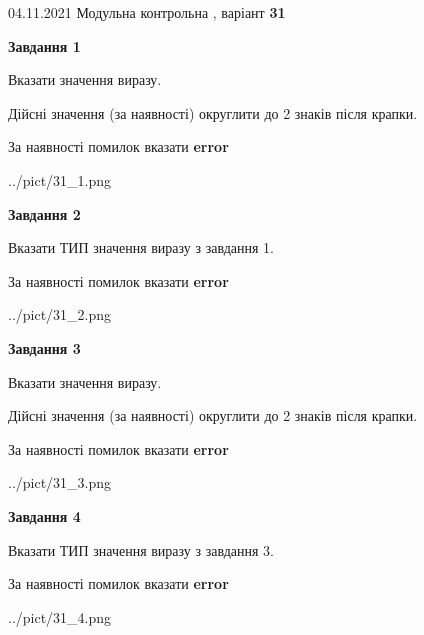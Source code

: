 \documentclass[11pt, ukrainian]{article}
\begin{document}
{04.11.2021 Модульна контрольна , варіант  \No \textbf { 31 }\par}
{
\begin {large}
{\begin {center}\textbf{Завдання 1}\end {center}}\par
Вказати значення виразу. \par
Дійсні значення (за наявності) округлити до 2 знаків після крапки. \par
За наявності помилок вказати \textbf{error}

\begin{center}
	{../pict/31_1.png}
\end{center}
\newpage

{\begin {center}\textbf{Завдання 2}\end {center}}\par
Вказати ТИП значення виразу з завдання 1. \par
За наявності помилок вказати \textbf{error}

\begin{center}
	{../pict/31_2.png}
\end{center}
\newpage

{\begin {center}\textbf{Завдання 3}\end {center}}\par
Вказати значення виразу. \par
Дійсні значення (за наявності) округлити до 2 знаків після крапки. \par
За наявності помилок вказати \textbf{error}

\begin{center}
	{../pict/31_3.png}
\end{center}
\newpage

{\begin {center}\textbf{Завдання 4}\end {center}}\par
Вказати ТИП значення виразу з завдання 3. \par
За наявності помилок вказати \textbf{error}

\begin{center}
	{../pict/31_4.png}
\end{center}
\newpage


\end{large}}
\end{document}
